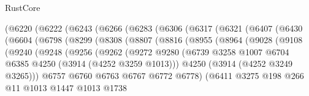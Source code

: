 \begin{lexlean}{RustCore}
\begin{coremodule}
        (@6220
          (@6222
            (@6243
              (@6266
                (@6283
                  (@6306
                    (@6317
                      (@6321
                        (@6407
                          (@6430
                            (@6604
                              (@6798
                                (@8299
                                  (@8308
                                    (@8807
                                      (@8816
                                        (@8955
                                          (@8964
                                            (@9028
                                              (@9108
                                                (@9240
                                                  (@9248
                                                    (@9256
                                                      (@9262
                                                        (@9272
                                                          @9280
                                                          (@6739
                                                            @3258
                                                            @1007
                                                            @6704
                                                            @6385
                                                            @4250
                                                            (@3914 (@4252 @3259 @1013)))
                                                          @4250
                                                          (@3914 (@4252 @3249 @3265)))
                                                        @6757
                                                        @6760
                                                        @6763
                                                        @6767
                                                        @6772
                                                        @6778)
                                                      (@6411
                                                        @3275
                                                        @198
                                                        @266
                                                        @11
                                                        @1013
                                                        @1447
                                                        @1013
                                                        @1738

\end{coremodule}
\end{lexlean}
